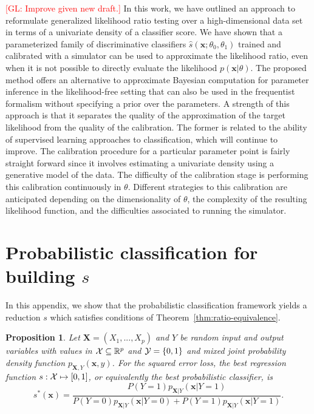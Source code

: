 \documentclass[12pt]{article}
\numberwithin{equation}{section}
\theoremstyle{plain}
\newtheorem{proposition}[theorem]{Proposition}
\newcommand{\glnote}[1]{\textcolor{red}{[GL: #1]}}
\begin{document}
\glnote{Improve given new draft.}
In this work, we have outlined an approach to reformulate generalized likelihood
ratio testing over a high-dimensional data set in terms of a univariate density
of a classifier score. We have shown that a parameterized family of
discriminative classifiers $\hat s(\mathbf{x}; \theta_0, \theta_1)$ trained and
calibrated with a simulator can be used to approximate the likelihood ratio,
even when it is not possible to directly evaluate the likelihood
$p(\mathbf{x}|\theta)$.
The proposed method offers an alternative to approximate Bayesian computation
for parameter inference in the likelihood-free setting that can also be used in
the frequentist formalism without specifying a prior over the parameters. A
strength of this approach is that it separates the quality of the approximation
of the target likelihood from the quality of the calibration. The former is
related to the ability of supervised learning approaches to  classification,
which will continue to improve. The calibration procedure for a particular
parameter point is fairly straight forward since it involves estimating a
univariate density using a generative model of the data. The difficulty of the
calibration stage is performing this calibration continuously in $\theta$.
Different strategies to this calibration are anticipated depending on the
dimensionality of $\theta$, the complexity of the resulting likelihood function,
and the difficulties associated to running the simulator.




\appendix

\section{Probabilistic classification for building $s$}
\label{app:clf-for-s}

In this appendix, we show that the probabilistic classification framework
yields a reduction $s$ which satisfies conditions of Theorem~\ref{thm:ratio-equivalence}.

\begin{proposition} \label{thm:best-classifier}
Let $\mathbf{X} = (X_1, ..., X_p)$ and $Y$ be random input and output variables
with values in ${\cal X} \subseteq \mathbb{R}^p$
and ${\cal Y} = \{0, 1\}$ and mixed joint probability density  function
$p_{\mathbf{X},Y}(\mathbf{x}, y)$. For the squared error loss, the best
regression function $s : {\cal X} \mapsto [0, 1]$, or equivalently the best
probabilistic classifier, is
\begin{equation}
s^*(\mathbf{x}) = \frac{P(Y=1) p_{\mathbf{X}|Y}(\mathbf{x}|Y=1)}{P(Y=0) p_{\mathbf{X}|Y}(\mathbf{x} | Y=0) + P(Y=1) p_{\mathbf{X}|Y}(\mathbf{x} | Y=1)}.
\end{equation}
\end{proposition}
\end{document}
